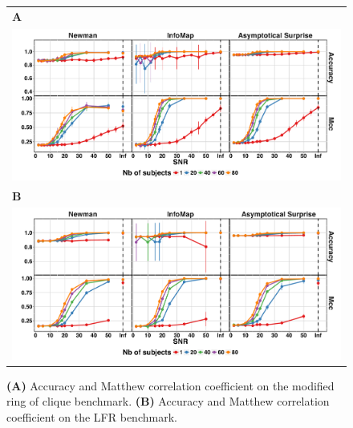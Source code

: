 \begin{figure}[!htb]
\centering
    \begin{tabular}{l}
    \textbf{\textsf{A}}  \\
    \includegraphics[width=1\textwidth]{images/figure3_supplementary.pdf} \\
    \textbf{\textsf{B}}  \\
    \includegraphics[width=1\textwidth]{images/figure4_supplementary.pdf}
    \end{tabular}
    \caption{\textbf{(A)} Accuracy and Matthew correlation coefficient on the modified ring of clique benchmark.
\textbf{(B)} Accuracy and Matthew correlation coefficient on the LFR benchmark.}
    \label{fig:accmcc}
\end{figure}


